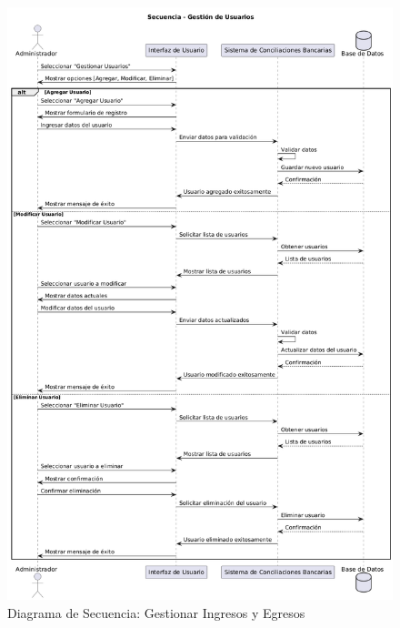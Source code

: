 \documentclass{article}
\begin{document}
\begin{figure}[H]
    \centering
    \includegraphics[width=\textwidth]{secuencia/GestionUsuarios.png}
    \caption{Diagrama de Secuencia: Gestionar Ingresos y Egresos}
\end{figure}
\end{document}
